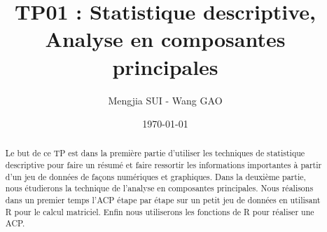 \documentclass{article}
\title{{\Large TP01 : Statistique descriptive, Analyse en composantes principales}}
\author{Mengjia SUI - Wang GAO}
\date{\today}
\begin{document}
	\renewcommand{\captionfont}{\small}
	\maketitle %
	
	\thispagestyle{fancy} %


\begin{abstract}
	
	Le but de ce TP est dans la première partie d'utiliser les techniques de statistique descriptive pour faire un résumé et faire ressortir les informations importantes à partir d’un jeu de données de façons numériques et graphiques. Dans la deuxième partie, nous étudierons la technique de l’analyse en composantes principales. Nous réalisons dans un premier temps l'ACP étape par étape sur un petit jeu de données en utilisant R pour le calcul matriciel. Enfin nous utiliserons les fonctions de R pour réaliser une ACP.
	
\end{abstract}
\end{document}
